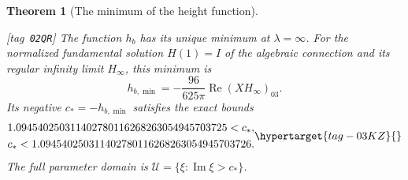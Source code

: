 \documentclass[11pt,a4paper]{article}
\numberwithin{equation}{section}
\newtheorem{theorem}{Theorem}[section]
\theoremstyle{definition}
\newcommand{\StatementRecord}[4]{{\upshape\footnotesize[tag~\texttt{#3}]}\enspace\ignorespaces}
\begin{document}
\begin{theorem}[The minimum of the height function]
\hypertarget{tag-02QR}{}\label{night:P1.18}
\StatementRecord{night:P1.18}{proved}{02QR}{\cref{night:P1.15,def:hb,night:P1.8,rem:V:conjugation-parameter}}
The function $h_b$ has its unique minimum at $\lambda=\infty$.
For the normalized fundamental solution $H(1)=I$ of the algebraic
connection and its regular infinity limit $H_\infty$, this minimum is
\[
 h_{b,\min}=-\frac{96}{625\pi}\operatorname{Re}(XH_\infty)_{03}.
\]
Its negative $c_*=-h_{b,\min}$ satisfies the exact bounds
\[
 \begin{gathered}
1.094540250311402780116268263054945703725<c_*,\\
c_*<1.094540250311402780116268263054945703726.
\end{gathered}
 \hypertarget{tag-03KZ}{}\label{layout:V:fresh-bounds}
\]
The full parameter domain is $\mathcal U=\{\xi:\operatorname{Im}\xi>c_*\}$.
\end{theorem}
\end{document}
